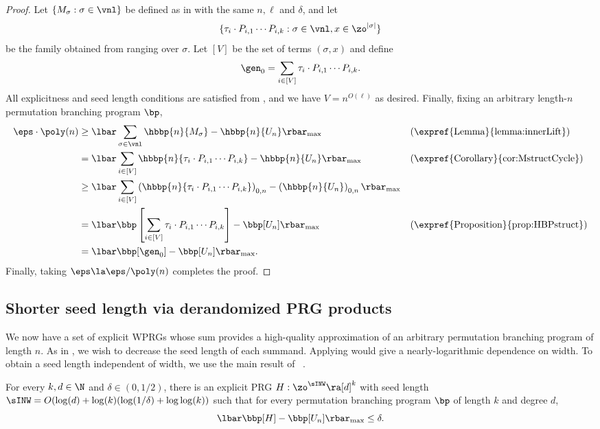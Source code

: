 \cycleRichardson*
\begin{proof}
Let $\{M_\sigma:\sigma \in \vnl\}$ be defined as in  with the same $n,\ell$ and $\delta$, and let 
$$\{\tau_{i}\cdot P_{i,1}\cdots P_{i,k}:\sigma\in \vnl,x\in \zo^{|\sigma|}\}$$ 
be the family obtained from  ranging over $\sigma$. Let $[V]$ be the set of terms $(\sigma,x)$ and define
\[\gen_0=\sum_{i\in[V]}\tau_{i}\cdot P_{i,1}\cdots P_{i,k}.\]
All explicitness and seed length conditions are satisfied from , and we have $V=n^{O(\ell)}$ as desired.
Finally, fixing an arbitrary length-$n$ permutation branching program $\bp$,
\begin{align*}
    \eps\cdot\poly(n) &\geq \lbar\sum_{\sigma \in \vnl} \hbbp{n}{M_\sigma}-\hbbp{n}{U_n}\rbar_{\max} && \text{(\expref{Lemma}{lemma:innerLift})}\\
    &= \lbar\sum_{i\in[V]} \hbbp{n}{\tau_{i}\cdot P_{i,1}\cdots P_{i,k}}-\hbbp{n}{U_n}\rbar_{\max} && \text{(\expref{Corollary}{cor:MstructCycle})}\\
    &\geq \lbar\sum_{i\in[V]}  \left(\hbbp{n}{\tau_{i}\cdot P_{i,1}\cdots P_{i,k}}\right)_{0,n}-\left(\hbbp{n}{U_n}\right)_{0,n}\rbar_{\max}\\
    &= \lbar\bbp\left[\sum_{i\in[V]}\tau_{i}\cdot P_{i,1}\cdots P_{i,k}\right]-\bbp[U_n]\rbar_{\max} && \text{(\expref{Proposition}{prop:HBPstruct})}\\
    &= \lbar \bbp[\gen_0] -\bbp[U_n]\rbar_{\max}.
\end{align*}
Finally, taking $\eps\la \eps/\poly(n)$ completes the proof.
\end{proof}

\subsection{Shorter seed length via derandomized PRG products}
We now have a set of explicit WPRGs whose sum provides a %
high-quality %
approximation of an arbitrary permutation branching program of length $n$. As in , we wish to decrease the seed length of each summand. Applying  would give a nearly-logarithmic dependence on width. To obtain a seed length independent of width, we use the main result of ~\cite{HozaPyVa21}. 

\begin{theorem}\label{thm:HPVinner}
For every $k,d\in \N$ and $\delta\in(0,1/2)$, there is an explicit PRG $H:\zo^{\sINW}\ra [d]^k$ with seed length $\sINW=O(\log(d)+\log(k)(\log(1/\delta)+\log\log(k))$ such that for every permutation branching program $\bp$ of length $k$ and degree $d$,
$$\lbar \bbp[H]-\bbp[U_n]\rbar_{\max}\leq \delta.$$
\end{theorem}

